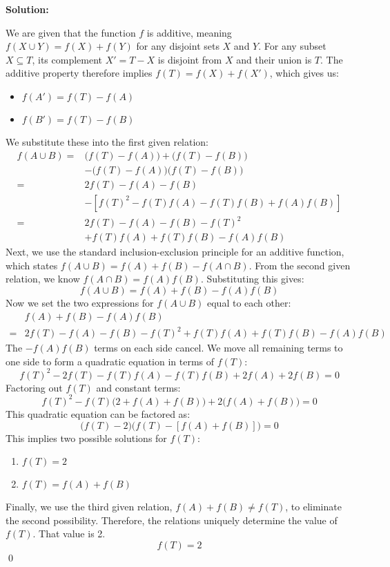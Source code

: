 \bigskip\noindent\textbf{Solution:}

We are given that the function \(f\) is additive, meaning \(f(X \cup Y) = f(X) + f(Y)\) for any disjoint sets \(X\) and \(Y\). For any subset \(X \subseteq T\), its complement \(X' = T - X\) is disjoint from \(X\) and their union is \(T\). The additive property therefore implies \(f(T) = f(X) + f(X')\), which gives us:
\begin{itemize}
\item \(f(A') = f(T) - f(A)\)
\item \(f(B') = f(T) - f(B)\)
\end{itemize}
We substitute these into the first given relation:
\begin{align*}
f(A \cup B) =& \big(f(T) - f(A)\big) + \big(f(T) - f(B)\big) \\
&- \big(f(T) - f(A)\big)\big(f(T) - f(B)\big) \\
=& 2f(T) - f(A) - f(B)  \\
&- \left[ f(T)^2 - f(T)f(A) - f(T)f(B) + f(A)f(B) \right] \\
=& 2f(T) - f(A) - f(B) - f(T)^2 \\
&+ f(T)f(A) + f(T)f(B) - f(A)f(B)
\end{align*}
Next, we use the standard inclusion-exclusion principle for an additive function, which states \(f(A \cup B) = f(A) + f(B) - f(A \cap B)\). From the second given relation, we know \(f(A \cap B) = f(A)f(B)\). Substituting this gives:
\[
f(A \cup B) = f(A) + f(B) - f(A)f(B)
\]
Now we set the two expressions for \(f(A \cup B)\) equal to each other:
\begin{align*}
&f(A) + f(B) - f(A)f(B) \\
=& 2f(T) - f(A) - f(B) - f(T)^2 + f(T)f(A) + f(T)f(B) - f(A)f(B)
\end{align*}
The \( -f(A)f(B) \) terms on each side cancel. We move all remaining terms to one side to form a quadratic equation in terms of \(f(T)\):
\[
f(T)^2 - 2f(T) - f(T)f(A) - f(T)f(B) + 2f(A) + 2f(B) = 0
\]
Factoring out \(f(T)\) and constant terms:
\[
f(T)^2 - f(T)\big(2 + f(A) + f(B)\big) + 2\big(f(A) + f(B)\big) = 0
\]
This quadratic equation can be factored as:
\[
\big(f(T) - 2\big) \big(f(T) - [f(A) + f(B)]\big) = 0
\]
This implies two possible solutions for \(f(T)\):
\begin{enumerate}
\item \(f(T) = 2\)
\item \(f(T) = f(A) + f(B)\)
\end{enumerate}
Finally, we use the third given relation, \(f(A) + f(B) \ne f(T)\), to eliminate the second possibility.
Therefore, the relations uniquely determine the value of \(f(T)\). That value is 2.
\[
\boxed{f(T) = 2}
\]\qed

